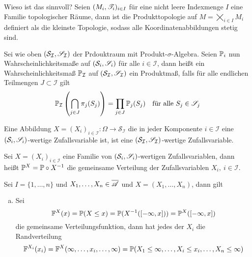 \documentclass{scrartcl}
\begin{document}
        Wieso ist das sinnvoll? Seien $(M_i,\cali{T}_i)_{i\in I}$ für eine nicht leere Indexmenge $I$ eine Familie topologischer Räume, dann ist die Produkttopologie auf $M=\bigtimes_{i\in I} M_i$ definiert als die kleinste 
        Topologie, sodass alle Koordinatenabbildungen stetig sind. 
        \begin{defn}
            Sei wie oben $(\mathcal{S}_\mathcal{I},\cali{S}_\mathcal{I})$ der Prdouktraum mit Produkt-$\sigma$-Algebra. Seien $\P_i$ nun Wahrscheinlichkeitsmaße auf $(\mathcal{S}_i,\cali{S}_i)$ für alle $i\in\mathcal{I}$, dann heißt ein Wahrscheinlichkeitsmaß $\P_\mathcal{I}$ auf $(\mathcal{S}_\mathcal{I},\cali{S}_\mathcal{I})$ ein Produktmaß, falls für alle endlichen Teilmengen $J\subset \mathcal{I}$ gilt
            \[
            \P_\mathcal{I}\left(\bigcap_{j\in J} \pi_j(S_j)\right) = \prod_{j\in J} \P_j(S_j) \quad \text{für alle } S_j\in \cali{S}_j 
            \]
        \end{defn}
        \begin{lemma}
            Eine Abbildung $X=(X_i)_{i\in \mathcal{I}}:\Omega\to \mathcal{S}_\mathcal{I}$ die in jeder Komponente $i\in \mathcal{I}$ eine $(\mathcal{S}_i,\cali{S}_i)$-wertige Zufallsvariable ist, ist eine $(\mathcal{S}_\mathcal{I},\cali{S}_\mathcal{I})$-wertige Zufallsvariable. 
        \end{lemma}
        \begin{defn}
            Sei $X=(X_i)_{i\in \mathcal{I}}$ eine Familie von $(\mathcal{S}_i,\cali{S}_i)$-wertigen Zufallsvariablen, dann heißt $\P^X=\P\circ X^{-1}$ die gemeinsame Verteilung der Zufallsvariablen $X_i, \ i\in \mathcal{I}$.
        \end{defn}
        \begin{satz}
            Sei $I=\{1,\ldots,n\}$ und $X_1,\ldots,X_n\in \overline{\cali{A}}$ und $X=(X_1,\ldots,X_n)$, dann gilt 
            \begin{enumerate}[(a)]
                \item Sei 
                \[
                \F^X(x) = \P(X\le x)=\P(X^{-1}([-\infty,x]))=\P^X([-\infty,x])     
                \]
                die gemeinsame Verteilungsfunktion, dann hat jedes der $X_i$ die Randverteilung
                \[
                \F^{X_i}(x_i) = \F^X(\infty,\ldots,x_i,\ldots,\infty) = \P(X_1\le \infty,\ldots,X_i\le x_i,\ldots,X_n\le\infty)    
                \]
            \end{enumerate}
        \end{satz}
    
\end{document}
